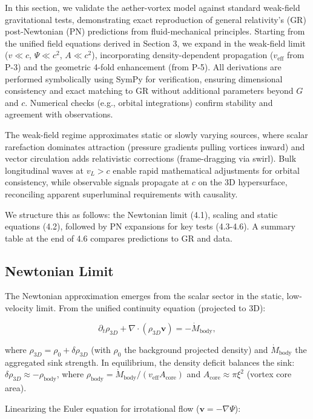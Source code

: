 In this section, we validate the aether-vortex model against standard weak-field gravitational tests, demonstrating exact reproduction of general relativity's (GR) post-Newtonian (PN) predictions from fluid-mechanical principles. Starting from the unified field equations derived in Section 3, we expand in the weak-field limit ($v \ll c$, $\Psi \ll c^2$, $A \ll c^2$), incorporating density-dependent propagation ($v_{\text{eff}}$ from P-3) and the geometric 4-fold enhancement (from P-5). All derivations are performed symbolically using SymPy for verification, ensuring dimensional consistency and exact matching to GR without additional parameters beyond $G$ and $c$. Numerical checks (e.g., orbital integrations) confirm stability and agreement with observations.

The weak-field regime approximates static or slowly varying sources, where scalar rarefaction dominates attraction (pressure gradients pulling vortices inward) and vector circulation adds relativistic corrections (frame-dragging via swirl). Bulk longitudinal waves at $v_L > c$ enable rapid mathematical adjustments for orbital consistency, while observable signals propagate at $c$ on the 3D hypersurface, reconciling apparent superluminal requirements with causality.

We structure this as follows: the Newtonian limit (4.1), scaling and static equations (4.2), followed by PN expansions for key tests (4.3-4.6). A summary table at the end of 4.6 compares predictions to GR and data.

\subsection{Newtonian Limit}

The Newtonian approximation emerges from the scalar sector in the static, low-velocity limit. From the unified continuity equation (projected to 3D):

\[
\partial_t \rho_{3D} + \nabla \cdot (\rho_{3D} \mathbf{v}) = -\dot{M}_{\text{body}},
\]

where $\rho_{3D} = \rho_0 + \delta \rho_{3D}$ (with $\rho_0$ the background projected density) and $\dot{M}_{\text{body}}$ the aggregated sink strength. In equilibrium, the density deficit balances the sink: $\delta \rho_{3D} \approx -\rho_{\text{body}}$, where $\rho_{\text{body}} = \dot{M}_{\text{body}} / (v_{\text{eff}} A_{\text{core}})$ and $A_{\text{core}} \approx \pi \xi^2$ (vortex core area).

Linearizing the Euler equation for irrotational flow ($\mathbf{v} = -\nabla \Psi$):

